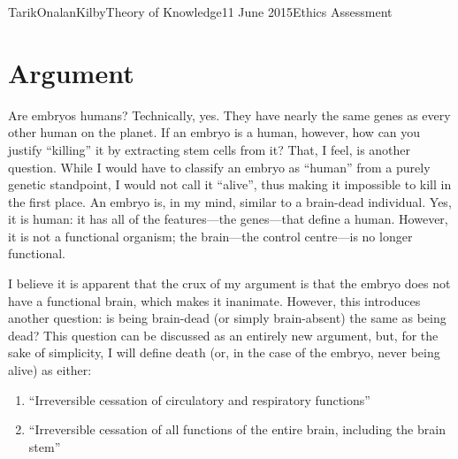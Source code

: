 \documentclass[a4paper,12pt]{article}
\begin{document}
    \begin{mla}{Tarik}{Onalan}{Kilby}{Theory of Knowledge}{11 June 2015}{Ethics Assessment}
        \section{Argument}
            Are embryos humans? Technically, yes. They have nearly the same genes as every other
            human on the planet. If an embryo is a human, however, how can you justify ``killing''
            it by extracting stem cells from it? That, I feel, is another question. While I would
            have to classify an embryo as ``human'' from a purely genetic standpoint, I would
            not call it ``alive'', thus making it impossible to kill in the first place. An embryo
            is, in my mind, similar to a brain-dead individual. Yes, it is human: it has all
            of the features---the genes---that define a human. However, it is not a functional
            organism; the brain---the control centre---is no longer functional.

            I believe it is apparent that the crux of my argument is that the embryo does not have
            a functional brain, which makes it inanimate. However, this introduces another question:
            is being brain-dead (or simply brain-absent) the same as being dead? This question
            can be discussed as an entirely new argument, but, for the sake of simplicity, I will
            define death (or, in the case of the embryo, never being alive) as either:
            \begin{enumerate}
                \item ``Irreversible cessation of circulatory and respiratory functions''
                \item ``Irreversible cessation of all functions of the entire brain, including the
                    brain stem''
            \end{enumerate}
            \autocite{death}
            

\end{mla}
\end{document}
